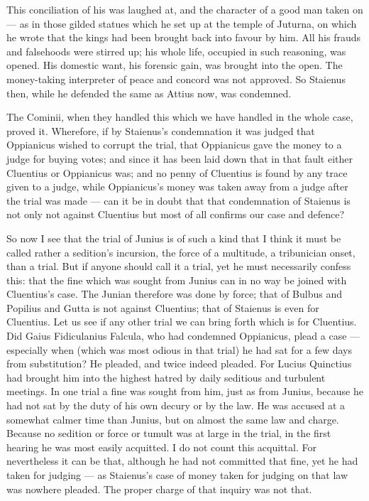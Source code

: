  This conciliation of his was laughed at, and the character of a good man taken on --- as in those gilded statues which he set up at the temple of Juturna, on which he wrote that the kings had been brought back into favour by him. All his frauds and falsehoods were stirred up; his whole life, occupied in such reasoning, was opened. His domestic want, his forensic gain, was brought into the open. The money-taking interpreter of peace and concord was not approved. So Staienus then, while he defended the same as Attius now, was condemned.

 The Cominii, when they handled this which we have handled in the whole case, proved it. Wherefore, if by Staienus's condemnation it was judged that Oppianicus wished to corrupt the trial, that Oppianicus gave the money to a judge for buying votes; and since it has been laid down that in that fault either Cluentius or Oppianicus was; and no penny of Cluentius is found by any trace given to a judge, while Oppianicus's money was taken away from a judge after the trial was made --- can it be in doubt that that condemnation of Staienus is not only not against Cluentius but most of all confirms our case and defence?

 So now I see that the trial of Junius is of such a kind that I think it must be called rather a sedition's incursion, the force of a multitude, a tribunician onset, than a trial. But if anyone should call it a trial, yet he must necessarily confess this: that the fine which was sought from Junius can in no way be joined with Cluentius's case. The Junian therefore was done by force; that of Bulbus and Popilius and Gutta is not against Cluentius; that of Staienus is even for Cluentius. Let us see if any other trial we can bring forth which is for Cluentius. Did Gaius Fidiculanius Falcula, who had condemned Oppianicus, plead a case --- especially when (which was most odious in that trial) he had sat for a few days from substitution? He pleaded, and twice indeed pleaded. For Lucius Quinctius had brought him into the highest hatred by daily seditious and turbulent meetings. In one trial a fine was sought from him, just as from Junius, because he had not sat by the duty of his own decury or by the law. He was accused at a somewhat calmer time than Junius, but on almost the same law and charge. Because no sedition or force or tumult was at large in the trial, in the first hearing he was most easily acquitted. I do not count this acquittal. For nevertheless it can be that, although he had not committed that fine, yet he had taken for judging --- as Staienus's case of money taken for judging on that law was nowhere pleaded. The proper charge of that inquiry was not that.


